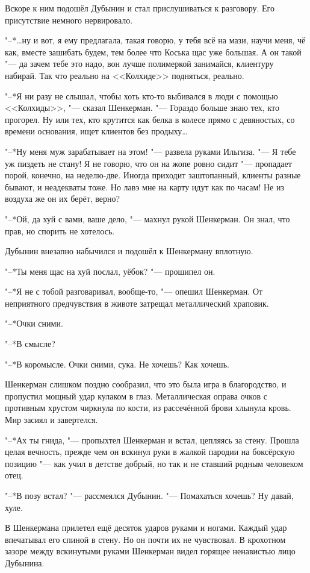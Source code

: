 Вскоре к ним подошёл Дубынин и стал прислушиваться к разговору.
Его присутствие немного нервировало.

"--*\dots{}ну и вот, я ему предлагала, такая говорю, у тебя всё на мази, научи меня, чё как, вместе зашибать будем, тем более что Коська щас уже большая.
А он такой "--- да зачем тебе это надо, вон лучше полимеркой занимайся, клиентуру набирай.
Так что реально на <<Колхиде>> подняться, реально.

"--*Я ни разу не слышал, чтобы хоть кто-то выбивался в люди с помощью <<Колхиды>>, "--- сказал Шенкерман.
"--- Гораздо больше знаю тех, кто прогорел.
Ну или тех, кто крутится как белка в колесе прямо с девяностых, со времени основания, ищет клиентов без продыху\dots{}

"--*Ну меня муж зарабатывает на этом! "--- развела руками Ильгиза.
"--- Я тебе уж пиздеть не стану!
Я не говорю, что он на жопе ровно сидит "--- пропадает порой, конечно, на неделю-две.
Иногда приходит заштопанный, клиенты разные бывают, и неадекваты тоже.
Но лавэ мне на карту идут как по часам!
Не из воздуха же он их берёт, верно?

"--*Ой, да хуй с вами, ваше дело, "--- махнул рукой Шенкерман.
Он знал, что прав, но спорить не хотелось.

Дубынин внезапно набычился и подошёл к Шенкерману вплотную.

"--*Ты меня щас на хуй послал, уёбок? "--- прошипел он.

"--*Я не с тобой разговаривал, вообще-то, "--- опешил Шенкерман.
От неприятного предчувствия в животе затрещал металлический храповик.

"--*Очки сними.

"--*В смысле?

"--*В коромысле.
Очки сними, сука.
Не хочешь?
Как хочешь.

Шенкерман слишком поздно сообразил, что это была игра в благородство, и пропустил мощный удар кулаком в глаз.
Металлическая оправа очков с противным хрустом чиркнула по кости, из рассечённой брови хлынула кровь.
Мир засиял и завертелся.

"--*Ах ты гнида, "--- пропыхтел Шенкерман и встал, цепляясь за стену.
Прошла целая вечность, прежде чем он вскинул руки в жалкой пародии на боксёрскую позицию "--- как учил в детстве добрый, но так и не ставший родным человеком отец.

"--*В позу встал? "--- рассмеялся Дубынин.
"--- Помахаться хочешь?
Ну давай, хуле.

В Шенкермана прилетел ещё десяток ударов руками и ногами.
Каждый удар впечатывал его спиной в стену.
Но он почти их не чувствовал.
В крохотном зазоре между вскинутыми руками Шенкерман видел горящее ненавистью лицо Дубынина.


